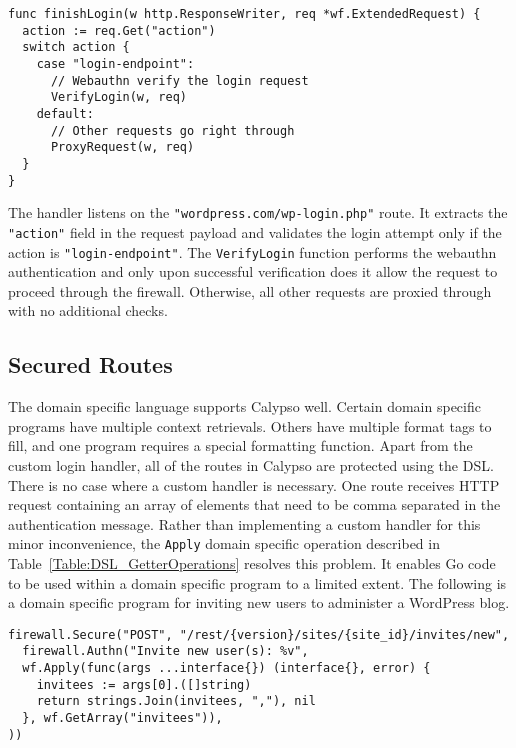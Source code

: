 \begin{lstlisting}[float=h]
func finishLogin(w http.ResponseWriter, req *wf.ExtendedRequest) {
  action := req.Get("action")
  switch action {
    case "login-endpoint":
      // Webauthn verify the login request
      VerifyLogin(w, req)
    default:
      // Other requests go right through
      ProxyRequest(w, req)
  }
}
\end{lstlisting}

The handler listens on the \lstinline{"wordpress.com/wp-login.php"} route. It extracts the \lstinline{"action"} field in the request payload and validates the login attempt only if the action is \lstinline{"login-endpoint"}. The \lstinline{VerifyLogin} function performs the webauthn authentication and only upon successful verification does it allow the request to proceed through the firewall. Otherwise, all other requests are proxied through with no additional checks.

\subsection{Secured Routes}\label{Sec:CalypsoSecuredRoutes}

The domain specific language supports Calypso well. Certain domain specific programs have multiple context retrievals. Others have multiple format tags to fill, and one program requires a special formatting function. Apart from the custom login handler, all of the routes in Calypso are protected using the DSL. There is no case where a custom handler is necessary. One route receives HTTP request containing an array of elements that need to be comma separated in the authentication message. Rather than implementing a custom handler for this minor inconvenience, the \lstinline{Apply} domain specific operation described in Table~\ref{Table:DSL_GetterOperations} resolves this problem. It enables Go code to be used within a domain specific program to a limited extent. The following is a domain specific program for inviting new users to administer a WordPress blog.

\begin{lstlisting}[float=h]
firewall.Secure("POST", "/rest/{version}/sites/{site_id}/invites/new", 
  firewall.Authn("Invite new user(s): %v",
  wf.Apply(func(args ...interface{}) (interface{}, error) {
    invitees := args[0].([]string)
    return strings.Join(invitees, ","), nil
  }, wf.GetArray("invitees")),
))
\end{lstlisting}

